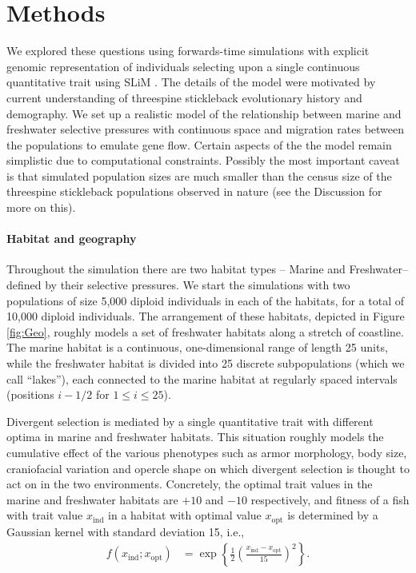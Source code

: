 \documentclass{article}
\begin{document}
\section*{Methods}

We explored these questions using forwards-time simulations with explicit genomic representation of individuals selecting upon a single continuous quantitative trait using SLiM \citep{haller2017slim,haller2018slim3}.
The details of the model were motivated by current understanding of threespine stickleback evolutionary history and demography.
We set up a realistic model of the relationship between marine and freshwater selective pressures with continuous space and migration rates between the populations to emulate gene flow. 
Certain aspects of the the model remain simplistic due to computational constraints.
Possibly the most important caveat is that simulated population sizes are much smaller than the census size of the threespine stickleback populations observed in nature
(see the Discussion for more on this).

\paragraph{Habitat and geography}
Throughout the simulation there are two habitat types -- Marine and Freshwater-- defined by their selective pressures.
We start the simulations with two populations of size 5,000 diploid individuals in each of the habitats, for a total of 10,000 diploid individuals.
The arrangement of these habitats, depicted in Figure \ref{fig:Geo},
roughly models a set of freshwater habitats along a stretch of coastline. 
The marine habitat is a continuous, one-dimensional range of length 25 units,
while the freshwater habitat is divided into 25 discrete subpopulations (which we call ``lakes''),
each connected to the marine habitat at regularly spaced intervals
(positions $i - 1/2$ for $1 \le i \le 25$).

Divergent selection is mediated by a single quantitative trait
with different optima in marine and freshwater habitats.
This situation roughly models the cumulative effect of the various phenotypes such as armor morphology, 
body size, craniofacial variation and opercle shape on which divergent selection is thought to act on in the two environments. 
Concretely, the optimal trait values in the marine and freshwater habitats are $+10$ and $-10$ respectively,
and fitness of a fish with trait value $x_\text{ind}$ in a habitat with optimal value $x_\text{opt}$
is determined by a Gaussian kernel with standard deviation 15, i.e.,
\begin{align*}
    f(x_\text{ind}; x_\text{opt})
    &=
    \exp\left\{
        \frac{1}{2}
            \left(
            \frac{x_\text{ind}-x_\text{opt}}{15}
            \right)^2
        \right\} .
\end{align*}
\end{document}
